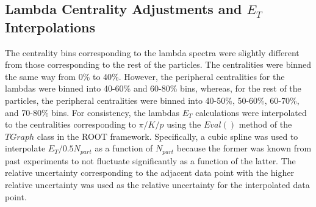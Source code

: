 \subsection{Lambda Centrality Adjustments and $E_{T}$ Interpolations}
The centrality bins corresponding to the lambda spectra were slightly different from those corresponding to the rest of the particles. The centralities were binned the same way from 0\% to 40\%. However, the peripheral centralities for the lambdas were binned into 40-60\% and 60-80\% bins, whereas, for the rest of the particles, the peripheral centralities were binned into 40-50\%, 50-60\%, 60-70\%, and 70-80\% bins. For consistency, the lambdas $E_{T}$ calculations were interpolated to the centralities corresponding to $\pi/K/p$ using the $Eval()$ method of the $TGraph$ class in the ROOT framework. Specifically, a cubic spline was used to interpolate $E_{T}/0.5N_{part}$ as a function of $N_{part}$ because the former was known from past experiments to not fluctuate significantly as a function of the latter. The relative uncertainty corresponding to the adjacent data point with the higher relative uncertainty was used as the relative uncertainty for the interpolated data point.
